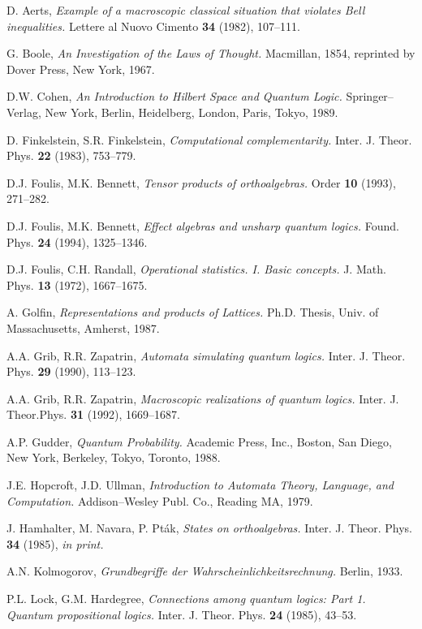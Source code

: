 \begin{thebibliography}{plain}

 D. Aerts,
{\it Example of a macroscopic classical situation that violates Bell
inequalities.}
Lettere al Nuovo Cimento {\bf 34} (1982), 107--111.

 G. Boole, {\it An Investigation of the Laws of Thought.}
Macmillan, 1854, reprinted by Dover Press, New York, 1967.

 D.W. Cohen, {\it An Introduction to Hilbert Space
and Quantum Logic.} Sprin\-ger--Verlag, New York, Berlin, Heidelberg,
London, Paris, Tokyo, 1989.


 D. Finkelstein, S.R. Finkelstein, {\it Computational
complementarity.} Inter. J. Theor. Phys. {\bf 22} (1983), 753--779.

 D.J. Foulis, M.K. Bennett, {\it Tensor products of
orthoalgebras.} Order {\bf 10} (1993), 271--282.

 D.J. Foulis, M.K. Bennett, {\it Effect algebras and
unsharp quantum logics.} Found. Phys. {\bf 24} (1994), 1325--1346.


 D.J. Foulis, C.H. Randall, {\it Operational
statistics. I. Basic concepts.} J. Math. Phys. {\bf 13} (1972), 1667--1675.

 A. Golfin, {\it Representations and products of Lattices.}
Ph.D. Thesis, Univ. of Massachusetts, Amherst, 1987.

 A.A. Grib, R.R. Zapatrin, {\it Automata
simulating quantum logics.} Inter. J. Theor. Phys. {\bf 29} (1990),
113--123.

 A.A. Grib, R.R. Zapatrin, {\it
Macroscopic realizations of
quantum logics.}  Inter. J. Theor.Phys. {\bf 31} (1992), 1669--1687.

 A.P. Gudder, {\it Quantum Probability.} Academic
Press, Inc., Boston, San Diego, New York, Berkeley, Tokyo,
Toronto, 1988.

 J.E. Hopcroft, J.D. Ullman,  {\it Introduction to
Automata Theory, Language, and Computation.} Addison--Wesley
Publ. Co., Reading MA, 1979.

 J. Hamhalter, M. Navara, P. Pt\'ak, {\it States on
orthoalgebras.} Inter. J. Theor. Phys. {\bf 34} (1985), {\it in print.}

 A.N. Kolmogorov, {\it Grundbegriffe der
Wahrscheinlichkeitsrechnung.} Berlin, 1933.

 P.L. Lock, G.M. Hardegree, {\it Connections among quantum
logics: Part 1.
Quantum propositional logics.} Inter. J. Theor. Phys. {\bf 24} (1985),
43--53.


\end{thebibliography}
